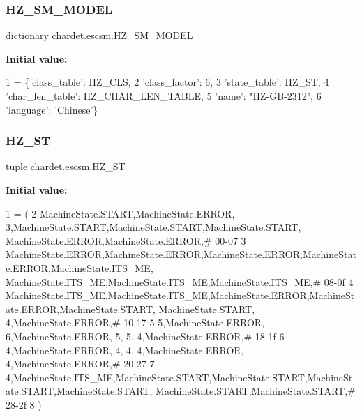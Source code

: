 \subsubsection{\texorpdfstring{H\+Z\+\_\+\+S\+M\+\_\+\+M\+O\+D\+EL}{HZ\_SM\_MODEL}}
{\footnotesize\ttfamily dictionary chardet.\+escsm.\+H\+Z\+\_\+\+S\+M\+\_\+\+M\+O\+D\+EL}

{\bfseries Initial value\+:}
\begin{DoxyCode}
1 =  \{\textcolor{stringliteral}{'class\_table'}: HZ\_CLS,
2                \textcolor{stringliteral}{'class\_factor'}: 6,
3                \textcolor{stringliteral}{'state\_table'}: HZ\_ST,
4                \textcolor{stringliteral}{'char\_len\_table'}: HZ\_CHAR\_LEN\_TABLE,
5                \textcolor{stringliteral}{'name'}: \textcolor{stringliteral}{"HZ-GB-2312"},
6                \textcolor{stringliteral}{'language'}: \textcolor{stringliteral}{'Chinese'}\}
\end{DoxyCode}
\mbox{\label{namespacechardet_1_1escsm_a146ce5619a41f2f42a08c2ca5fca9cd1}} 
\subsubsection{\texorpdfstring{H\+Z\+\_\+\+ST}{HZ\_ST}}
{\footnotesize\ttfamily tuple chardet.\+escsm.\+H\+Z\+\_\+\+ST}

{\bfseries Initial value\+:}
\begin{DoxyCode}
1 =  (
2 MachineState.START,MachineState.ERROR,     3,MachineState.START,MachineState.START,MachineState.START,
      MachineState.ERROR,MachineState.ERROR,\textcolor{comment}{# 00-07}
3 MachineState.ERROR,MachineState.ERROR,MachineState.ERROR,MachineState.ERROR,MachineState.ITS\_ME,
      MachineState.ITS\_ME,MachineState.ITS\_ME,MachineState.ITS\_ME,\textcolor{comment}{# 08-0f}
4 MachineState.ITS\_ME,MachineState.ITS\_ME,MachineState.ERROR,MachineState.ERROR,MachineState.START,
      MachineState.START,     4,MachineState.ERROR,\textcolor{comment}{# 10-17}
5      5,MachineState.ERROR,     6,MachineState.ERROR,     5,     5,     4,MachineState.ERROR,\textcolor{comment}{# 18-1f}
6      4,MachineState.ERROR,     4,     4,     4,MachineState.ERROR,     4,MachineState.ERROR,\textcolor{comment}{# 20-27}
7      4,MachineState.ITS\_ME,MachineState.START,MachineState.START,MachineState.START,MachineState.START,
      MachineState.START,MachineState.START,\textcolor{comment}{# 28-2f}
8 )
\end{DoxyCode}
\mbox{\label{namespacechardet_1_1escsm_a26665cea8461b3c6ba10d9430887c654}} 
